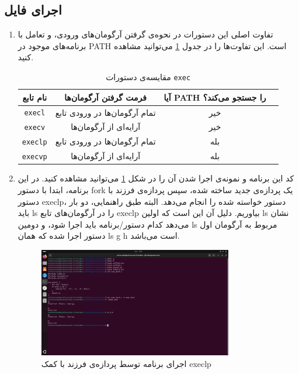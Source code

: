 \documentclass[12pt]{article}
\begin{document}
        \subsection{اجرای فایل}
        \begin{enumerate}
        \item 
        تفاوت اصلی این دستورات در نحوه‌ی گرفتن آرگومان‌های ورودی، و تعامل با برنامه‌های موجود در
        \textenglish{PATH}
        است. این تفاوت‌ها را در جدول
        \ref{tab1}
        ‌می‌توانید مشاهده کنید.

        \begin{table}[h!]
            \centering
            \begin{tabular}{|c|c|c|c|}
            \hline
            نام تابع & فرمت گرفتن آرگومان‌ها & آیا \textenglish{PATH} را جستجو می‌کند؟ \\
            \hline
            \texttt{execl}   & تمام آرگومان‌ها در ورودی تابع & خیر \\
            \texttt{execv}   & آرایه‌ای از آرگومان‌ها & خیر \\
            \texttt{execlp}  & تمام آرگومان‌ها در ورودی تابع & بله \\
            \texttt{execvp}  & آرایه‌ای از آرگومان‌ها & بله  \\
            \hline
            \end{tabular}
            \caption{مقایسه‌ی دستورات \texttt{exec}}
            \label{tab1}
        \end{table}

        \item 
        کد این برنامه و نمونه‌ی اجرا شدن آن را در شکل 
        \ref{im12}
        می‌توانید مشاهده کنید. در این برنامه، ابتدا با دستور 
        \textenglish{fork}
        یک پردازه‌ی جدید ساخته شده، سپس پردازه‌ی فرزند با دستور
        \textenglish{execlp}،
        دستور خواسته شده را انجام می‌دهد. البته طبق راهنمایی، دو بار باید 
        \textenglish{ls}
        را در آرگومان‌های تابع
        \textenglish{execlp}
        بیاوریم. دلیل آن این است که اولین
        \textenglish{ls}
        نشان می‌دهد کدام دستور/برنامه باید اجرا شود، و دومین
        \textenglish{ls}
        مربوط به آرگومان اول دستور اجرا شده که همان
        \textenglish{ls g h}
        است می‌باشد.

        \begin{figure}[H]
		\centering
		\includegraphics[width=0.8\textwidth]{report4-resources/12.png}
		\caption{اجرای برنامه توسط پردازه‌ی فرزند با کمک \textenglish{execlp}}
            \label{im12}
	\end{figure}
        \end{enumerate}
\end{document}
